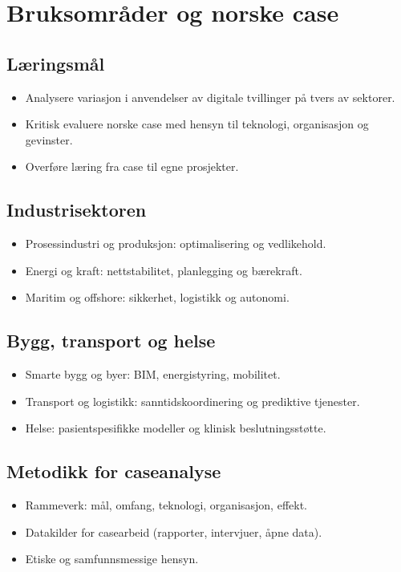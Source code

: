\chapter{Bruksområder og norske case}

\section{Læringsmål}
\begin{itemize}
    \item Analysere variasjon i anvendelser av digitale tvillinger på tvers av sektorer.
    \item Kritisk evaluere norske case med hensyn til teknologi, organisasjon og gevinster.
    \item Overføre læring fra case til egne prosjekter.
\end{itemize}

\section{Industrisektoren}
\begin{itemize}
    \item Prosessindustri og produksjon: optimalisering og vedlikehold.
    \item Energi og kraft: nettstabilitet, planlegging og bærekraft.
    \item Maritim og offshore: sikkerhet, logistikk og autonomi.
\end{itemize}

\section{Bygg, transport og helse}
\begin{itemize}
    \item Smarte bygg og byer: BIM, energistyring, mobilitet.
    \item Transport og logistikk: sanntidskoordinering og prediktive tjenester.
    \item Helse: pasientspesifikke modeller og klinisk beslutningsstøtte.
\end{itemize}

\section{Metodikk for caseanalyse}
\begin{itemize}
    \item Rammeverk: mål, omfang, teknologi, organisasjon, effekt.
    \item Datakilder for casearbeid (rapporter, intervjuer, åpne data).
    \item Etiske og samfunnsmessige hensyn.
\end{itemize}

